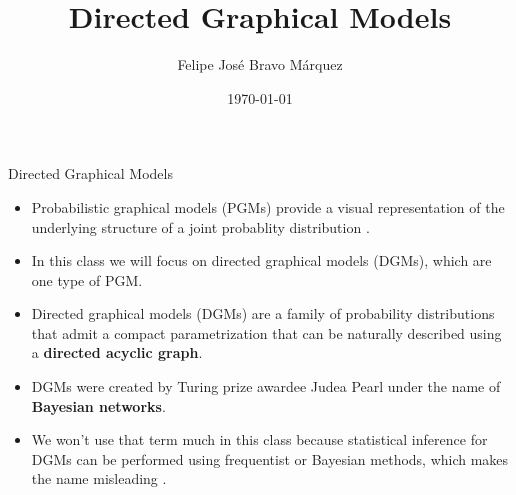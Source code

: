 \documentclass[handout]{beamer}
\title{Directed Graphical Models}
\author[Felipe Bravo Márquez]{\footnotesize
 \textcolor[rgb]{0.00,0.00,1.00}{Felipe José Bravo Márquez}}
\date{ \today }
\begin{document}
\begin{frame}
\titlepage


\end{frame}




\begin{frame}{Directed Graphical Models}
\scriptsize{
\begin{itemize}
\item Probabilistic graphical models (PGMs) provide a visual representation of the underlying structure of a joint probablity distribution \cite{ruozzi}.


\item In this class we will focus on directed graphical models (DGMs), which are one type of PGM.

\item Directed graphical models (DGMs) are a family of probability distributions that admit a compact parametrization that can be naturally described using a \textbf{directed acyclic graph}.

\item DGMs were created by Turing prize awardee Judea Pearl under the name of \textbf{Bayesian networks}.

\item We won't use that term much in this class because statistical inference for DGMs can be performed using frequentist or Bayesian methods, which makes the name misleading \cite{wasserman2013all}.


 
\end{itemize}



} 

\end{frame}
\end{document}
